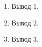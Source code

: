 \documentclass[../main.tex]{subfiles}
\begin{document}
  1. Вывод 1.

  2. Вывод 2.

  3. Вывод 3.
\end{document}
